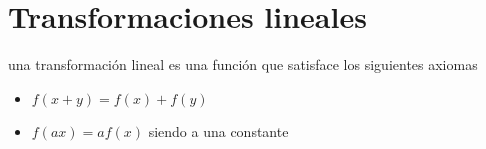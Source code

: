 \section{Transformaciones lineales}
una transformación lineal es una función que satisface los siguientes axiomas
\begin{itemize}
\item $f(x+y)=f(x)+f(y)$
\item $f(ax)=af(x)$ siendo a una constante
\end{itemize}
